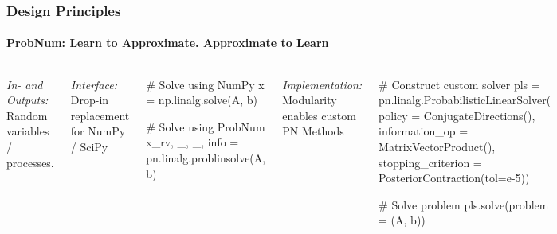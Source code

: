 \documentclass[10pt,usepdftitle=false,aspectratio=169]{beamer}
\begin{document}
\begin{frame}[fragile]\frametitle{Design Principles}
	\framesubtitle{ProbNum: Learn to Approximate. Approximate to Learn}

	\begin{columns}[totalwidth=\textwidth]

		\emph{In- and Outputs:} Random variables / processes.

		\vspace{2ex}

		\emph{Interface:} Drop-in replacement for NumPy / SciPy

		\begin{python}
		# Solve using NumPy
		x = np.linalg.solve(A, b)

		# Solve using ProbNum
		x_rv, _, _, info = pn.linalg.problinsolve(A, b)\end{python}
		\vspace{2ex}

		\emph{Implementation:} Modularity enables custom PN Methods

		\begin{python}
		# Construct custom solver
		pls = pn.linalg.ProbabilisticLinearSolver(
			policy = ConjugateDirections(),
			information_op = MatrixVectorProduct(),
			stopping_criterion = PosteriorContraction(tol=e-5))
			
		# Solve problem
		pls.solve(problem = (A, b))\end{python}

		\centering

\end{columns}
\end{frame}
\end{document}

